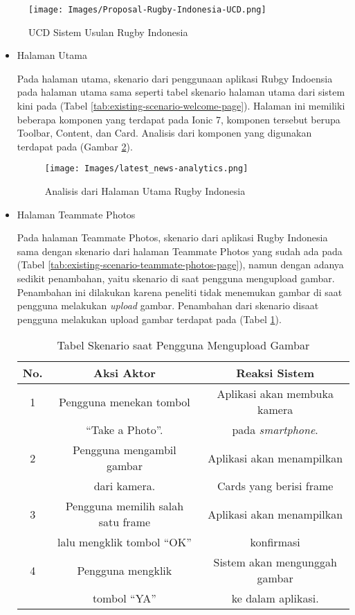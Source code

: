 \documentclass[a4paper,twoside]{article}
\begin{document}
\begin{enumerate}
\begin{itemize}
\begin{figure} [H]
    \centering
    \texttt{[image: Images/Proposal-Rugby-Indonesia-UCD.png]}
    \caption{UCD Sistem Usulan Rugby Indonesia}
    \label{fig:proposal-ucd-rugby-indonesia}
\end{figure}

    \begin{itemize}
        \item Halaman Utama

    Pada halaman utama, skenario dari penggunaan aplikasi Rubgy Indoensia pada halaman utama sama seperti tabel skenario halaman utama dari sistem kini pada (Tabel \ref{tab:existing-scenario-welcome-page}). Halaman ini memiliki beberapa komponen yang terdapat pada Ionic 7, komponen tersebut berupa Toolbar, Content, dan Card. Analisis dari komponen yang digunakan terdapat pada (Gambar \ref{fig:homepage-analytics}).

\begin{figure} [H]
    \centering
    \texttt{[image: Images/latest\_news-analytics.png]}
    \caption{Analisis dari Halaman Utama Rugby Indonesia}
    \label{fig:homepage-analytics}
\end{figure}


        \item Halaman Teammate Photos
        
Pada halaman Teammate Photos, skenario dari aplikasi Rugby Indonesia sama dengan skenario dari halaman Teammate Photos yang sudah ada pada (Tabel \ref{tab:existing-scenario-teammate-photos-page}), namun dengan adanya sedikit penambahan, yaitu skenario di saat pengguna mengupload gambar. Penambahan ini dilakukan karena peneliti tidak menemukan gambar di saat pengguna melakukan \textit{upload} gambar. Penambahan dari skenario disaat pengguna melakukan upload gambar terdapat pada (Tabel \ref{tab:usulan-skenario-halaman-teammate-photos}).
\begin{table} [H]
    \centering
    \caption{Tabel Skenario saat Pengguna Mengupload Gambar}
    \begin{tabular}{|c|c|c|}
    \hline
       No. & Aksi Aktor & Reaksi Sistem  \\ \hline
        1 & Pengguna menekan tombol  & Aplikasi akan membuka kamera \\
         & ``Take a Photo''. & pada \textit{smartphone}. \\ \hline
        2 & Pengguna mengambil gambar & Aplikasi akan menampilkan \\ 
         & dari kamera. & Cards yang berisi frame \\ \hline
        3 & Pengguna memilih salah satu frame & Aplikasi akan menampilkan \\ 
         & lalu mengklik tombol ``OK'' & konfirmasi \\ \hline
        4 & Pengguna mengklik & Sistem akan mengunggah gambar \\ 
         & tombol ``YA'' & ke dalam aplikasi. \\ \hline
    \end{tabular}
    \label{tab:usulan-skenario-halaman-teammate-photos}
\end{table}


\end{itemize}
\end{itemize}
\end{enumerate}
\end{document}
